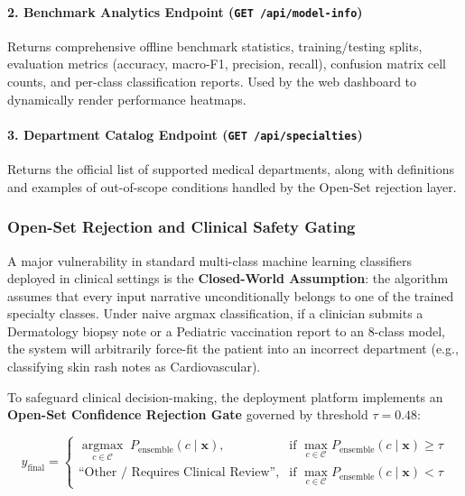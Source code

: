 \paragraph{2. Benchmark Analytics Endpoint (\texttt{GET /api/model-info})}
Returns comprehensive offline benchmark statistics, training/testing splits, evaluation metrics (accuracy, macro-F1, precision, recall), confusion matrix cell counts, and per-class classification reports. Used by the web dashboard to dynamically render performance heatmaps.

\paragraph{3. Department Catalog Endpoint (\texttt{GET /api/specialties})}
Returns the official list of supported medical departments, along with definitions and examples of out-of-scope conditions handled by the Open-Set rejection layer.

\subsubsection{Open-Set Rejection and Clinical Safety Gating}

A major vulnerability in standard multi-class machine learning classifiers deployed in clinical settings is the \textbf{Closed-World Assumption}: the algorithm assumes that every input narrative unconditionally belongs to one of the trained specialty classes. Under naive argmax classification, if a clinician submits a Dermatology biopsy note or a Pediatric vaccination report to an 8-class model, the system will arbitrarily force-fit the patient into an incorrect department (e.g., classifying skin rash notes as Cardiovascular).

To safeguard clinical decision-making, the deployment platform implements an \textbf{Open-Set Confidence Rejection Gate} governed by threshold $\tau = 0.48$:

\begin{equation}
\hat{y}_{\text{final}} = 
\begin{cases} 
\underset{c \in \mathcal{C}}{\operatorname{argmax}} \; P_{\text{ensemble}}(c \mid \mathbf{x}), & \text{if } \max_{c \in \mathcal{C}} P_{\text{ensemble}}(c \mid \mathbf{x}) \ge \tau \\[8pt]
\text{``Other / Requires Clinical Review''}, & \text{if } \max_{c \in \mathcal{C}} P_{\text{ensemble}}(c \mid \mathbf{x}) < \tau 
\end{cases}
\label{eq:openset_deployment}
\end{equation}

